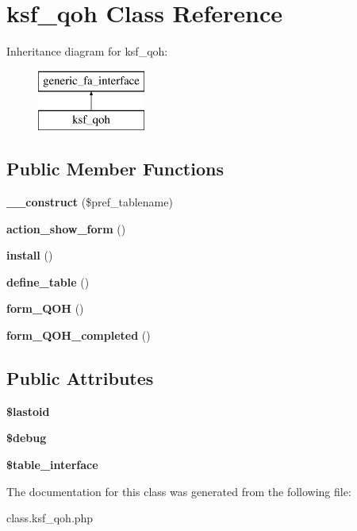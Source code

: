 \hypertarget{classksf__qoh}{}\section{ksf\+\_\+qoh Class Reference}
\label{classksf__qoh}
Inheritance diagram for ksf\+\_\+qoh\+:\begin{figure}[H]
\begin{center}
\leavevmode
\includegraphics[height=2.000000cm]{d4/ddb/classksf__qoh}
\end{center}
\end{figure}
\subsection*{Public Member Functions}
\begin{DoxyCompactItemize}
\item 
\hypertarget{classksf__qoh_a88b17299dbe9629f0324c9467acb519c}{}\label{classksf__qoh_a88b17299dbe9629f0324c9467acb519c} 
{\bfseries \+\_\+\+\_\+construct} (\$pref\+\_\+tablename)
\item 
\hypertarget{classksf__qoh_a27b8ae75d4ab4242fa873d700844fefc}{}\label{classksf__qoh_a27b8ae75d4ab4242fa873d700844fefc} 
{\bfseries action\+\_\+show\+\_\+form} ()
\item 
\hypertarget{classksf__qoh_a49694928ddf8ba4fb2af958462844adc}{}\label{classksf__qoh_a49694928ddf8ba4fb2af958462844adc} 
{\bfseries install} ()
\item 
\hypertarget{classksf__qoh_ad3d78d238db357e68ec01a8658541863}{}\label{classksf__qoh_ad3d78d238db357e68ec01a8658541863} 
{\bfseries define\+\_\+table} ()
\item 
\hypertarget{classksf__qoh_af8be3379eb49d26640cac2a28e44492e}{}\label{classksf__qoh_af8be3379eb49d26640cac2a28e44492e} 
{\bfseries form\+\_\+\+Q\+OH} ()
\item 
\hypertarget{classksf__qoh_a3ed511b20a8bfa1779fd88811db1487c}{}\label{classksf__qoh_a3ed511b20a8bfa1779fd88811db1487c} 
{\bfseries form\+\_\+\+Q\+O\+H\+\_\+completed} ()
\end{DoxyCompactItemize}
\subsection*{Public Attributes}
\begin{DoxyCompactItemize}
\item 
\hypertarget{classksf__qoh_a46e393cfb2996da9b7d8ab1bae9bec02}{}\label{classksf__qoh_a46e393cfb2996da9b7d8ab1bae9bec02} 
{\bfseries \$lastoid}
\item 
\hypertarget{classksf__qoh_a584caab866fce5180de1dc88dae8bbe0}{}\label{classksf__qoh_a584caab866fce5180de1dc88dae8bbe0} 
{\bfseries \$debug}
\item 
\hypertarget{classksf__qoh_adf1dc3ce6f6aee017abfb3a1dd869951}{}\label{classksf__qoh_adf1dc3ce6f6aee017abfb3a1dd869951} 
{\bfseries \$table\+\_\+interface}
\end{DoxyCompactItemize}


The documentation for this class was generated from the following file\+:\begin{DoxyCompactItemize}
\item 
class.\+ksf\+\_\+qoh.\+php\end{DoxyCompactItemize}
